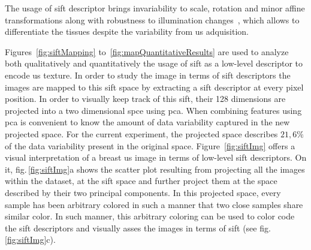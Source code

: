 \documentclass[a4paper, 10pt, conference]{llncs}      %
\begin{document}
The usage of \ac{sift} descriptor brings invariability to scale, rotation and minor affine transformations along with robustness to illumination changes~\cite{lowe2004distinctive}, which allows to differentiate the tissues despite the variability from \ac{us} adquisition.



Figures~\ref{fig:siftMapping} to~\ref{fig:mapQuantitativeResults} are used to analyze both qualitatively and quantitatively the usage of \ac{sift} as a low-level descriptor to encode \ac{us} texture. In order to study the image in terms of \ac{sift} descriptors the images are mapped to this \ac{sift} space by extracting a \ac{sift} descriptor at every pixel position. In order to visually keep track of this \ac{sift}, their 128 dimensions are projected into a two dimensional spce using \ac{pca}. When combining features using \ac{pca} is convenient to know the amount of data variability captured in the new projected space. For the current experiment, the projected space describes $21,6\%$ of the data variability present in the original space. 
Figure~\ref{fig:siftImg} offers a visual interpretation of a breast \ac{us} image in terms of low-level \ac{sift} descriptors. On it, fig.\,\ref{fig:siftImg}a shows the scatter plot resulting from projecting all the images within the dataset, at the \ac{sift} space and further project them at the space described by their two principal components. In this projected space, every sample has been arbitrary colored in such a manner that two close samples share similar color. In such manner, this arbitrary coloring can be used to color code the \ac{sift} descriptors and visually asses the images in terms of \ac{sift} (see fig.\,\ref{fig:siftImg}c).
\end{document}
